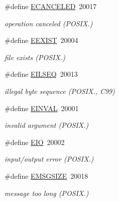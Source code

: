 \begin{DoxyCompactItemize}
\mbox{\label{group__hal_ga9532d840ef91fd8e1ecc5d7ca7cbf212}} 
\#define \hyperlink{group__hal_ga9532d840ef91fd8e1ecc5d7ca7cbf212}{E\+C\+A\+N\+C\+E\+L\+ED}~20017
\begin{DoxyCompactList}\small\item\em operation canceled (P\+O\+S\+I\+X.) \end{DoxyCompactList}\item 
\mbox{\label{group__hal_ga0a3bef9e5c47e42917692b5dae3b5498}} 
\#define \hyperlink{group__hal_ga0a3bef9e5c47e42917692b5dae3b5498}{E\+E\+X\+I\+ST}~20004
\begin{DoxyCompactList}\small\item\em file exists (P\+O\+S\+I\+X.) \end{DoxyCompactList}\item 
\mbox{\label{group__hal_gac6c071293826a4e66a717bb38db7794d}} 
\#define \hyperlink{group__hal_gac6c071293826a4e66a717bb38db7794d}{E\+I\+L\+S\+EQ}~20013
\begin{DoxyCompactList}\small\item\em illegal byte sequence (P\+O\+S\+I\+X., C99) \end{DoxyCompactList}\item 
\mbox{\label{group__hal_ga2d1678d5a7cc8ce499643f3b8957def4}} 
\#define \hyperlink{group__hal_ga2d1678d5a7cc8ce499643f3b8957def4}{E\+I\+N\+V\+AL}~20001
\begin{DoxyCompactList}\small\item\em invalid argument (P\+O\+S\+I\+X.) \end{DoxyCompactList}\item 
\mbox{\label{group__hal_ga70979f50f9c83e5aebab3d6a1bd4cf35}} 
\#define \hyperlink{group__hal_ga70979f50f9c83e5aebab3d6a1bd4cf35}{E\+IO}~20002
\begin{DoxyCompactList}\small\item\em input/output error (P\+O\+S\+I\+X.) \end{DoxyCompactList}\item 
\mbox{\label{group__hal_gae37becfaa095a9df5c5c788bce5aa06f}} 
\#define \hyperlink{group__hal_gae37becfaa095a9df5c5c788bce5aa06f}{E\+M\+S\+G\+S\+I\+ZE}~20018
\begin{DoxyCompactList}\small\item\em message too long (P\+O\+S\+I\+X.) \end{DoxyCompactList}\item 

\end{DoxyCompactItemize}
